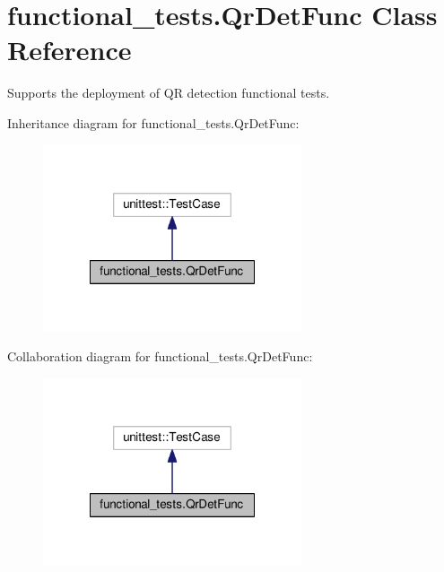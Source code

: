 \hypertarget{classfunctional__tests_1_1QrDetFunc}{\section{functional\-\_\-tests.\-Qr\-Det\-Func Class Reference}
\label{classfunctional__tests_1_1QrDetFunc}
}


Supports the deployment of Q\-R detection functional tests.  




Inheritance diagram for functional\-\_\-tests.\-Qr\-Det\-Func\-:
\nopagebreak
\begin{figure}[H]
\begin{center}
\leavevmode
\includegraphics[width=216pt]{classfunctional__tests_1_1QrDetFunc__inherit__graph}
\end{center}
\end{figure}


Collaboration diagram for functional\-\_\-tests.\-Qr\-Det\-Func\-:
\nopagebreak
\begin{figure}[H]
\begin{center}
\leavevmode
\includegraphics[width=216pt]{classfunctional__tests_1_1QrDetFunc__coll__graph}
\end{center}
\end{figure}
